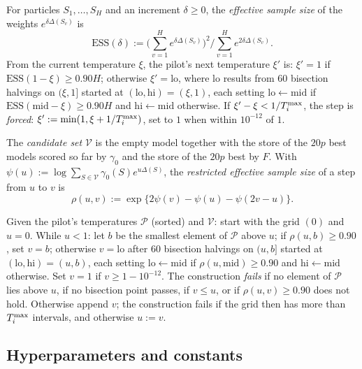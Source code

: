 \begin{definition}\label{def:pilot}
For particles $S_1,\dots,S_H$ and an increment $\delta\ge0$, the \emph{effective sample size} of the weights
$e^{\delta\Delta(S_v)}$ is
\[
  \mathrm{ESS}(\delta):=\Big(\sum_{v=1}^He^{\delta\Delta(S_v)}\Big)^2\Big/\sum_{v=1}^He^{2\delta\Delta(S_v)} .
\]
From the current temperature $\xi$, the pilot's next temperature $\xi'$ is: $\xi'=1$ if $\mathrm{ESS}(1-\xi)\ge0.90H$;
otherwise $\xi'=\mathrm{lo}$, where $\mathrm{lo}$ results from $60$ bisection halvings on $(\xi,1]$ started at
$(\mathrm{lo},\mathrm{hi})=(\xi,1)$, each setting $\mathrm{lo}\leftarrow\mathrm{mid}$ if
$\mathrm{ESS}(\mathrm{mid}-\xi)\ge0.90H$ and $\mathrm{hi}\leftarrow\mathrm{mid}$ otherwise. If $\xi'-\xi<1/T^{\max}_i$, the
step is \emph{forced}: $\xi':=\min(1,\xi+1/T^{\max}_i)$, set to $1$ when within $10^{-12}$ of $1$.
\end{definition}

\begin{definition}\label{def:rho}
The \emph{candidate set} $\mathcal V$ is the empty model together with the store of the $20p$ best models scored so far by
$\gamma_0$ and the store of the $20p$ best by $F$. With $\psi(u):=\log\sum_{S\in\mathcal V}\gamma_0(S)e^{u\Delta(S)}$, the
\emph{restricted effective sample size} of a step from $u$ to $v$ is
\[
  \rho(u,v):=\exp\{2\psi(v)-\psi(u)-\psi(2v-u)\}.
\]
\end{definition}

\begin{definition}\label{def:gridrule}
Given the pilot's temperatures $\mathcal P$ (sorted) and $\mathcal V$: start with the grid $(0)$ and $u=0$. While $u<1$:
let $b$ be the smallest element of $\mathcal P$ above $u$; if $\rho(u,b)\ge0.90$, set $v=b$; otherwise $v=\mathrm{lo}$
after $60$ bisection halvings on $(u,b]$ started at $(\mathrm{lo},\mathrm{hi})=(u,b)$, each setting
$\mathrm{lo}\leftarrow\mathrm{mid}$ if $\rho(u,\mathrm{mid})\ge0.90$ and $\mathrm{hi}\leftarrow\mathrm{mid}$ otherwise.
Set $v=1$ if $v\ge1-10^{-12}$. The construction \emph{fails} if no element of $\mathcal P$ lies
above $u$, if no bisection point passes, if $v\le u$, or if $\rho(u,v)\ge0.90$ does not hold. Otherwise append $v$; the
construction fails if the grid then has more than $T^{\max}_i$ intervals, and otherwise $u:=v$.
\end{definition}

\subsection{Hyperparameters and constants}

